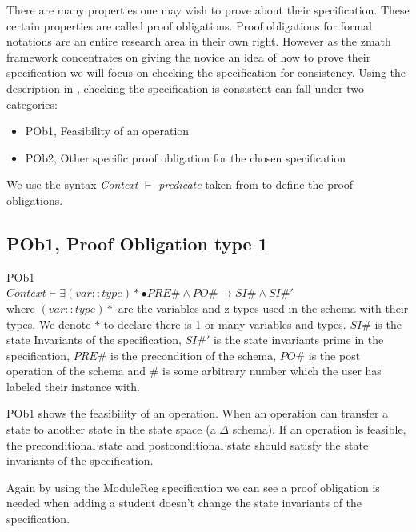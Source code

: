 There are many properties one may wish to prove about their specification. These
certain properties are called proof obligations. Proof obligations for formal
notations are an entire research area in their own right. However as the
\gls{zmath} framework concentrates on giving the novice an idea of how to prove
their specification we will focus on checking the specification for consistency.
Using the description in \cite{DBLP:conf/icsea/WenMZ06}, checking the
specification is consistent can fall under two categories:

\begin{itemize}
\item POb1, Feasibility of an operation
\item POb2, Other specific proof obligation for the chosen specification
\end{itemize}

We use the syntax \textit{Context} $\vdash$ \textit{predicate} taken from
\cite{DBLP:conf/icsea/WenMZ06} to define the proof obligations.

\subsection{POb1, Proof Obligation type 1}
\label{subsec:pob1}

\begin{defin}\label{defa}POb1\\

$Context \vdash \exists (var::type)* \bullet PRE\# \land PO\# \longrightarrow
SI\# \land SI\#'$\\

\noindent where $(var::type)*$ are the variables and z-types used in the schema
with their types. We denote $*$ to declare there is 1 or many variables and
types. $SI\#$ is the state Invariants of the specification, $SI\#'$ is the state
invariants prime in the specification, $PRE\#$ is the precondition of the
schema, $PO\#$ is the post operation of the schema and $\#$ is some arbitrary
number which the user has labeled their instance with.
\end{defin}

POb1 shows the feasibility of an operation. When an operation can transfer a
state to another state in the state space (a $\Delta$ schema). If an operation
is feasible, the preconditional state and postconditional state should satisfy
the state invariants of the specification.

Again by using the ModuleReg specification we can see a proof obligation is
needed when adding a student doesn't change the state invariants of the
specification.

